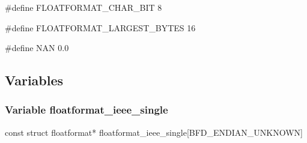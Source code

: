 {\stt \#define FLOATFORMAT\_CHAR\_BIT 8}

\medskip
{\stt \#define FLOATFORMAT\_LARGEST\_BYTES 16}

\medskip
{\stt \#define NAN 0.0}


\subsection{Variables}


\subsubsection{Variable floatformat\_ieee\_single}
\label{var_floatformat_ieee_single_doublest.c}

{\stt const struct floatformat* floatformat\_ieee\_single[BFD\_ENDIAN\_UNKNOWN]}

